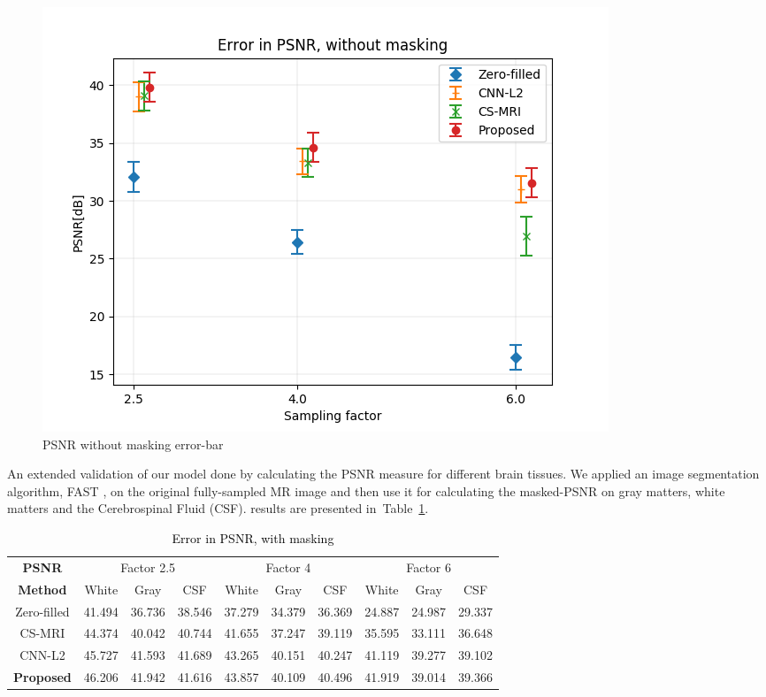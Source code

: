 \documentclass[review]{elsarticle}
\begin{document}
\begin{figure}[h]
\centering
\includegraphics[width=0.7\linewidth]{include/grp2/error_psnr_errorbar}
\caption{PSNR without masking error-bar}
\end{figure}\label{fig:error_psnr_errorbar}

An extended validation of our model done by calculating the PSNR measure for different brain tissues. We applied an image segmentation algorithm, FAST \cite{zhang2001segmentation}, on the original fully-sampled MR image and then use it for calculating the masked-PSNR on gray matters, white matters and the Cerebrospinal Fluid (CSF). results are presented in~Table~\ref{tbl:PSNR_WITH_MASK}.


\begin{table}[H]
	\centering
\begin{tabular}{|c||c|c|c||c|c|c||c|c|c|}
	\hline 
	\textbf{PSNR} & \multicolumn{3}{c||}{Factor 2.5} & \multicolumn{3}{c||}{Factor 4} & \multicolumn{3}{c|}{Factor 6}\tabularnewline
	\cline{2-10} 
	 \textbf{Method}& White & Gray & CSF & White & Gray & CSF & White & Gray & CSF\tabularnewline
	 \hline 
	 Zero-filled & 41.494 & 36.736 & 38.546 & 37.279 & 34.379 & 36.369 & 24.887 & 24.987 & 29.337\tabularnewline
	 \hline 
	 CS-MRI & 44.374 & 40.042 & 40.744 & 41.655 & 37.247 & 39.119 & 35.595 & 33.111 & 36.648\tabularnewline
	 \hline 
	 CNN-L2 & 45.727 & 41.593 & 41.689 & 43.265 & 40.151 & 40.247 & 41.119 & 39.277 & 39.102\tabularnewline
	 \hline 
	 \textbf{Proposed} & 46.206 & 41.942 & 41.616 & 43.857 & 40.109 & 40.496 & 41.919 & 39.014 & 39.366\tabularnewline
	 \hline 
\end{tabular}
\caption{\textcolor{black}{\footnotesize{}{}Error in PSNR, with masking}{\footnotesize{}\label{tbl:PSNR_WITH_MASK}}}
\end{table}

\end{document}
